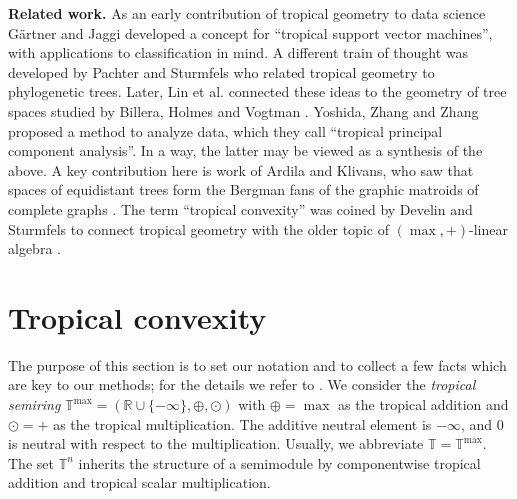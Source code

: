 \documentclass[a4paper,12pt]{amsart}
\newcommand\RR{{\mathbb R}}
\newcommand\TT{{\mathbb T}}
\newcommand\TTmax{\TT^{\max}}
\theoremstyle{remark}
\begin{document}
\noindent \textbf{Related work.}
As an early contribution of tropical geometry to data science G\"{a}rtner and Jaggi \cite{GaertnerJaggi:2006} developed a concept for \enquote{tropical support vector machines}, with applications to classification in mind.
A different train of thought was developed by Pachter and Sturmfels \cite[]{ASCB} who related tropical geometry to phylogenetic trees.
Later, Lin et al. \cite{ConvTreeSp} connected these ideas to the geometry of tree spaces studied by Billera, Holmes and Vogtman \cite{BilleraHolmesVogtmann01}.
Yoshida, Zhang and Zhang \cite{YoshidaZhangZhang:2019} proposed a method to analyze data, which they call \enquote{tropical principal component analysis}.
In a way, the latter may be viewed as a synthesis of the above.
A key contribution here is work of Ardila and Klivans, who saw that spaces of equidistant trees form the Bergman fans of the graphic matroids of complete graphs \cite{ArdilaKlivans:2006}.
The term \enquote{tropical convexity} was coined by Develin and Sturmfels \cite{Develin+Sturmfels:2004} to connect tropical geometry with the older topic of $(\max,+)$-linear algebra \cite{Butkovic:2010}.

\section{Tropical convexity} \label{sec:tconv}
\noindent
The purpose of this section is to set our notation and to collect a few facts which are key to our methods; for the details we refer to \cite{ETC}.
We consider the \emph{tropical semiring} $\TTmax=(\RR\cup\{-\infty\},\oplus,\odot)$ with $\oplus=\max$ as the tropical addition and $\odot=+$ as the tropical multiplication.
The additive neutral element is $-\infty$, and $0$ is neutral with respect to the multiplication.
Usually, we abbreviate $\TT=\TTmax$.
The set $\TT^n$ inherits the structure of a semimodule by componentwise tropical addition and tropical scalar multiplication.
\end{document}
